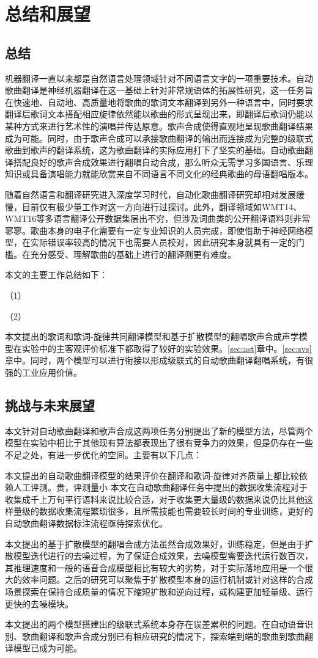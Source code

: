 



% 
\chapter{总结和展望}
\section{总结}
机器翻译一直以来都是自然语言处理领域针对不同语言文字的一项重要技术。自动歌曲翻译是神经机器翻译在这一基础上针对非常规语体的拓展性研究，这一任务旨在快速地、自动地、高质量地将歌曲的歌词文本翻译到另外一种语言中，同时要求翻译后歌词文本搭配相应旋律依然能以歌曲的形式呈现出来，即翻译后歌词仍能以某种方式来进行艺术性的演唱并传达原意。歌声合成使得直观地呈现歌曲翻译结果成为可能。同时，由于歌声合成可以承接歌曲翻译的输出而连接成为完整的级联式歌曲到歌声的翻译系统，这为歌曲翻译的实际应用打下了坚实的基础。自动歌曲翻译搭配良好的歌声合成效果进行翻唱自动合成，那么听众无需学习多国语言、乐理知识或具备演唱能力就能欣赏来自不同语言不同文化的经典歌曲的母语翻唱版本。

随着自然语言和翻译研究进入深度学习时代，自动化歌曲翻译研究却相对发展缓慢，目前仅有极少量工作对这一方向进行过探讨。此外，翻译领域如WMT14、WMT16等多语言翻译公开数据集层出不穷，但涉及词曲类的公开翻译语料则非常寥寥。歌曲本身的电子化需要有一定专业知识的人员完成，即使借助于神经网络模型，在实际错误率较高的情况下也需要人员校对，因此研究本身就具有一定的门槛。在充分感受、理解歌曲的基础上进行的翻译则更有难度。

本文的主要工作总结如下：

（1）

（2）

本文提出的歌词和歌词-旋律共同翻译模型和基于扩散模型的翻唱歌声合成声学模型在实验中的主客观评价标准下都取得了较好的实验效果。\ref{sec:ast}章中。\ref{sec:svs}章中。同时，两个模型可以进行衔接以形成级联式的自动歌曲翻译翻唱系统，有很强的工业应用价值。
\section{挑战与未来展望}
本文针对自动歌曲翻译和歌声合成这两项任务分别提出了新的模型方法，尽管两个模型在实验中相比于其他现有算法都表现出了很有竞争力的效果，但是仍存在一些不足之处，有进一步优化的空间。主要有以下几点：

本文提出的自动歌曲翻译模型的结果评价在翻译和歌词-旋律对齐质量上都比较依赖人工评测。贵，评测量小
本文在自动歌曲翻译任务中提出的数据收集流程对于收集成千上万句平行语料来说比较合适，对于收集更大量级的数据来说仍比其他这样量级的数据收集流程繁琐很多，且所需技能也需要较长时间的专业训练，更好的自动歌曲翻译数据标注流程亟待探索优化。

本文提出的基于扩散模型的翻唱合成方法虽然合成效果好，训练稳定，但是由于扩散模型迭代进行的去噪过程，为了保证合成效果，去噪模型需要迭代运行数百次，其推理速度和一般的语音合成模型相比有较大的劣势，对于实际落地应用是一个很大的效率问题。之后的研究可以聚焦于扩散模型本身的运行机制或针对这样的合成场景探索在保持合成质量的情况下缩短扩散和逆向过程，或构建更加轻量级、运行更快的去噪模块。

本文提出的两个模型搭建出的级联式系统本身存在误差累积的问题。在自动语音识别、歌曲翻译和歌声合成分别已有相应研究的情况下，探索端到端的歌曲到歌曲翻译模型已成为可能。
